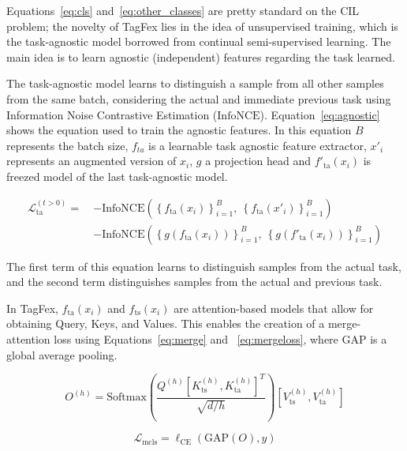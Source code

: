 \documentclass[letterpaper]{article} %
\begin{document}
Equations~\ref{eq:cls} and~\ref{eq:other_classes} are pretty standard on the CIL problem; the novelty of TagFex lies in the idea of unsupervised training, which is the task-agnostic model borrowed from continual semi-supervised learning. The main idea is to learn agnostic (independent) features regarding the task learned. 

The task-agnostic model learns to distinguish a sample from all other samples from the same batch, considering the actual and immediate previous task using Information Noise Contrastive Estimation ($\mathrm{InfoNCE} $)\cite{chen2020simple}. Equation~\ref{eq:agnostic} shows the equation used to train the agnostic features. In this equation $B$ represents the batch size, $f_{ta}$ is a learnable task agnostic feature extractor, $x'_i$ represents an augmented version of $x_i$, $g$ a projection head and $f'_{\text{ta}}(x_i)$ is freezed model of the last task-agnostic model. 


\begin{align} \label{eq:agnostic}
\mathcal{L}_{\text{ta}}^{(t > 0)} =\ 
& -\mathrm{InfoNCE} \left( \left\{ f_{\text{ta}}(x_i) \right\}_{i=1}^{B},\ \left\{ f_{\text{ta}}(x'_i) \right\}_{i=1}^{B} \right) \nonumber \\
& -\mathrm{InfoNCE} \left( \left\{ g(f_{\text{ta}}(x_i)) \right\}_{i=1}^{B},\ \left\{g( f'_{\text{ta}}(x_i)) \right\}_{i=1}^{B} \right)
\end{align}

The first term of this equation learns to distinguish samples from the actual task, and the second term distinguishes samples from the actual and previous task. 

In TagFex, $f_{\text{ta}}(x_i)$ and $f_{\text{ts}}(x_i)$ are attention-based models that allow for obtaining Query, Keys, and Values. This enables the creation of a merge-attention loss using Equations~\ref{eq:merge} and ~\ref{eq:mergeloss}, where GAP is a global average pooling.

\begin{equation}\label{eq:merge}
O^{(h)} = \mathrm{Softmax} \left( 
\frac{Q^{(h)} \left[ K_{\text{ts}}^{(h)}, K_{\text{ta}}^{(h)} \right]^T}
{\sqrt{d / h}} 
\right)
\left[ V_{\text{ts}}^{(h)}, V_{\text{ta}}^{(h)} \right]
\end{equation}

\begin{equation}\label{eq:mergeloss}
\mathcal{L}_{\text{mcls}} = \ell_{\text{CE}}(\mathrm{GAP}(O), y)
\end{equation}
\end{document}
